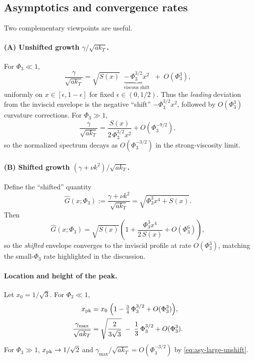 \documentclass[aps,pre,twocolumn,showpacs,superscriptaddress]{revtex4-2}
\theoremstyle{definition}
\begin{document}
\subsection{Asymptotics and convergence rates}\label{subsec:asymptotics}

Two complementary viewpoints are useful.

\paragraph*{(A) Unshifted growth \(\gamma/\sqrt{a k_T}\).}
For $\Phi_3\ll 1$,
\begin{equation}\label{eq:asy-small-unshift}
\frac{\gamma}{\sqrt{a k_T}}
= \sqrt{S(x)} \;\;\underbrace{-\,\Phi_3^{3/2}x^2}_{\text{viscous shift}}\;\;+\; O(\Phi_3^3),
\end{equation}
uniformly on $x\in[\epsilon,1-\epsilon]$ for fixed $\epsilon\in(0,1/2)$. Thus the \emph{leading} deviation from the inviscid envelope is the negative “shift” $-\Phi_3^{3/2}x^2$, followed by $O(\Phi_3^3)$ curvature corrections. For $\Phi_3\gg 1$,
\begin{equation}\label{eq:asy-large-unshift}
\frac{\gamma}{\sqrt{a k_T}}=\frac{S(x)}{2\,\Phi_3^{3/2}x^2}+O(\Phi_3^{-9/2}),
\end{equation}
so the normalized spectrum decays as $O(\Phi_3^{-3/2})$ in the strong‑viscosity limit.

\paragraph*{(B) Shifted growth \((\gamma+\nu k^2)/\sqrt{a k_T}\).}
Define the “shifted” quantity
\[
\widehat{G}(x;\Phi_3):=\frac{\gamma+\nu k^2}{\sqrt{a k_T}}=\sqrt{\Phi_3^3 x^4 + S(x)}.
\]
Then
\begin{equation}\label{eq:asy-small-shift}
\widehat{G}(x;\Phi_3)=\sqrt{S(x)}\left(1+\frac{\Phi_3^3 x^4}{2\,S(x)}+O(\Phi_3^6)\right),
\end{equation}
so the \emph{shifted} envelope converges to the inviscid profile at rate $O(\Phi_3^3)$, matching the small‑$\Phi_3$ rate highlighted in the discussion.

\paragraph*{Location and height of the peak.}
Let $x_0=1/\sqrt{3}$. For $\Phi_3\ll 1$,
\begin{align}
x_{\rm pk}&=x_0\;\Big(1-\tfrac{3}{4}\,\Phi_3^{3/2}+O(\Phi_3^{3})\Big),\nonumber\\
\frac{\gamma_{\max}}{\sqrt{a k_T}}&=\sqrt{\frac{2}{3\sqrt{3}}}\;-\;\frac{1}{3}\,\Phi_3^{3/2}+O(\Phi_3^{3}). \label{eq:peak-corr}
\end{align}
For $\Phi_3\gg 1$, $x_{\rm pk}\to 1/\sqrt{2}$ and $\gamma_{\max}/\sqrt{a k_T}=O(\Phi_3^{-3/2})$ by \eqref{eq:asy-large-unshift}.
\end{document}
